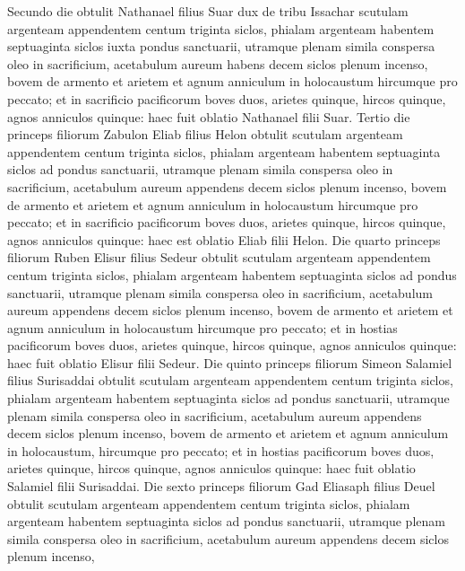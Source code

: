 \begin{biblechapter}
\begin{biblechapter}
\begin{biblechapter}
\begin{biblechapter}
\begin{biblechapter}
\begin{biblechapter}
\begin{biblechapter}
 \verse Secundo die obtulit Nathanael filius Suar dux de tribu Issachar 
\verse scutulam argenteam appendentem centum triginta siclos, phialam argenteam habentem septuaginta siclos iuxta pondus sanctuarii, utramque plenam simila conspersa oleo in sacrificium, 
\verse acetabulum aureum habens decem siclos plenum incenso, 
\verse bovem de armento et arietem et agnum anniculum in holocaustum 
\verse hircumque pro peccato; 
\verse et in sacrificio pacificorum boves duos, arietes quinque, hircos quinque, agnos anniculos quinque: haec fuit oblatio Nathanael filii Suar.
 \verse Tertio die princeps filiorum Zabulon Eliab filius Helon 
\verse obtulit scutulam argenteam appendentem centum triginta siclos, phialam argenteam habentem septuaginta siclos ad pondus sanctuarii, utramque plenam simila conspersa oleo in sacrificium, 
\verse acetabulum aureum appendens decem siclos plenum incenso, 
\verse bovem de armento et arietem et agnum anniculum in holocaustum 
\verse hircumque pro peccato; 
\verse et in sacrificio pacificorum boves duos, arietes quinque, hircos quinque, agnos anniculos quinque: haec est oblatio Eliab filii Helon.
 \verse Die quarto princeps filiorum Ruben Elisur filius Sedeur 
\verse obtulit scutulam argenteam appendentem centum triginta siclos, phialam argenteam habentem septuaginta siclos ad pondus sanctuarii, utramque plenam simila conspersa oleo in sacrificium, 
\verse acetabulum aureum appendens decem siclos plenum incenso, 
\verse bovem de armento et arietem et agnum anniculum in holocaustum 
\verse hircumque pro peccato; 
\verse et in hostias pacificorum boves duos, arietes quinque, hircos quinque, agnos anniculos quinque: haec fuit oblatio Elisur filii Sedeur.
 \verse Die quinto princeps filiorum Simeon Salamiel filius Surisaddai 
\verse obtulit scutulam argenteam appendentem centum triginta siclos, phialam argenteam habentem septuaginta siclos ad pondus sanctuarii, utramque plenam simila conspersa oleo in sacrificium, 
\verse acetabulum aureum appendens decem siclos plenum incenso, 
\verse bovem de armento et arietem et agnum anniculum in holocaustum, 
\verse hircumque pro peccato; 
\verse et in hostias pacificorum boves duos, arietes quinque, hircos quinque, agnos anniculos quinque: haec fuit oblatio Salamiel filii Surisaddai.
 \verse Die sexto princeps filiorum Gad Eliasaph filius Deuel 
\verse obtulit scutulam argenteam appendentem centum triginta siclos, phialam argenteam habentem septuaginta siclos ad pondus sanctuarii, utramque plenam simila conspersa oleo in sacrificium, 
\verse acetabulum aureum appendens decem siclos plenum incenso, 

\end{biblechapter}
\end{biblechapter}
\end{biblechapter}
\end{biblechapter}
\end{biblechapter}
\end{biblechapter}
\end{biblechapter}

